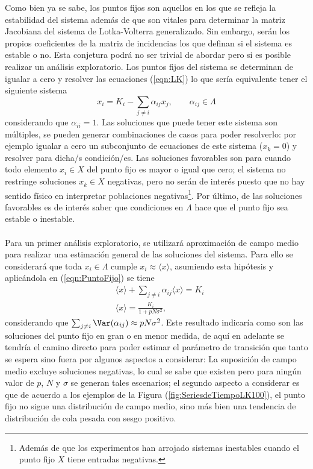 Como bien ya se sabe, los puntos fijos son aquellos en los que se refleja la estabilidad del sistema además de que son vitales para determinar la matriz Jacobiana del sistema de Lotka-Volterra generalizado. Sin embargo, serán los propios coeficientes de la matriz de incidencias los que definan si el sistema es estable o no. Esta conjetura podrá no ser trivial de abordar pero si es posible realizar un análisis exploratorio. Los puntos fijos del sistema se determinan de igualar a cero y resolver las ecuaciones (\ref{eqn:LK}) lo que sería equivalente tener el siguiente sistema
\begin{equation}\label{eqn:PuntoFijo}
	x_i=K_i-\sum_{j\neq i}\alpha_{ij}x_j,\qquad\alpha_{ij}\in\Lambda
\end{equation}
considerando que $\alpha_{ii}=1$. Las soluciones que puede tener este sistema son múltiples, se pueden generar combinaciones de casos para poder resolverlo: por ejemplo igualar a cero un subconjunto de ecuaciones de este sistema ($x_{k}=0$) y resolver para dicha/s condición/es. Las soluciones favorables son para cuando todo elemento $x_i\in X$ del punto fijo es mayor o igual que cero; el sistema no restringe soluciones $x_k\in X$ negativas, pero no serán de interés puesto que no hay sentido físico en interpretar poblaciones negativas\footnote{Además de que los experimentos han arrojado sistemas inestables cuando el punto fijo $X$ tiene entradas negativas.}. Por último, de las soluciones favorables es de interés saber que condiciones en $\Lambda$ hace que el punto fijo sea estable o inestable.\\
\\
Para un primer análisis exploratorio, se utilizará aproximación de campo medio para realizar una estimación general de las soluciones del sistema. Para ello se considerará que toda $x_i\in\Lambda$ cumple $x_i\approx\langle x\rangle$, asumiendo esta hipótesis y aplicándola en (\ref{eqn:PuntoFijo}) se tiene
\begin{equation}
	\begin{split}
		&\langle x\rangle+\sum_{j\neq i}\alpha_{ij}\langle x\rangle=K_i\\
		&\langle x\rangle=\frac{K_i}{1+pN\sigma^2},\qquad 
	\end{split}
\end{equation}
considerando que $\sum_{j\neq i}\Var(\alpha_{ij})\approx pN\sigma^2$. Este resultado indicaría como son las soluciones del punto fijo en gran o en menor medida, de aquí en adelante se tendría el camino directo para poder estimar el parámetro de transición que tanto se espera sino fuera por algunos aspectos a considerar: La suposición de campo medio excluye soluciones negativas, lo cual se sabe que existen pero para ningún valor de $p$, $N$ y $\sigma$ se generan tales escenarios; el segundo aspecto a considerar es que de acuerdo a los ejemplos de la Figura (\ref{fig:SeriesdeTiempoLK100}), el punto fijo no sigue una distribución de campo medio, sino más bien una tendencia de distribución de cola pesada con sesgo positivo. \\
